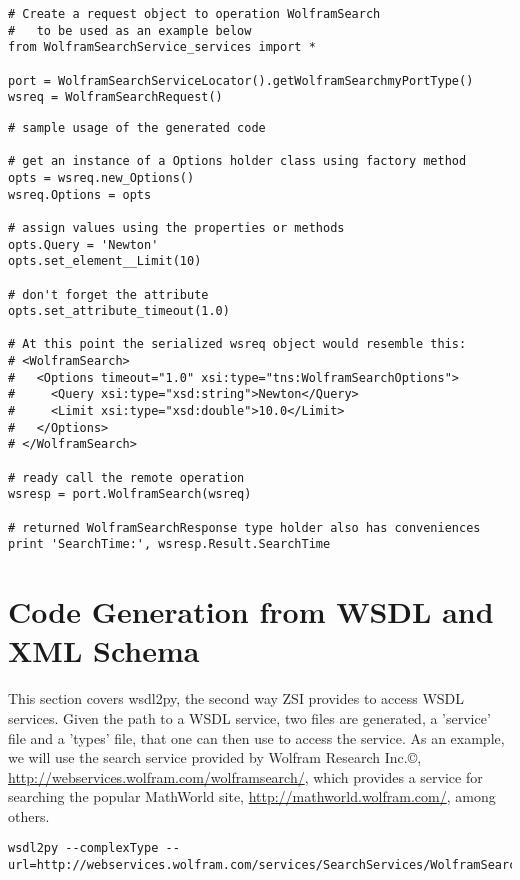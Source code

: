 \begin{verbatim}
# Create a request object to operation WolframSearch
#   to be used as an example below
from WolframSearchService_services import *

port = WolframSearchServiceLocator().getWolframSearchmyPortType()
wsreq = WolframSearchRequest()
\end{verbatim}



\begin{verbatim}
# sample usage of the generated code

# get an instance of a Options holder class using factory method
opts = wsreq.new_Options()
wsreq.Options = opts

# assign values using the properties or methods
opts.Query = 'Newton'
opts.set_element__Limit(10)

# don't forget the attribute
opts.set_attribute_timeout(1.0)

# At this point the serialized wsreq object would resemble this:
# <WolframSearch>
#   <Options timeout="1.0" xsi:type="tns:WolframSearchOptions">
#     <Query xsi:type="xsd:string">Newton</Query>
#     <Limit xsi:type="xsd:double">10.0</Limit>
#   </Options>
# </WolframSearch>

# ready call the remote operation
wsresp = port.WolframSearch(wsreq)

# returned WolframSearchResponse type holder also has conveniences
print 'SearchTime:', wsresp.Result.SearchTime
\end{verbatim}

\section{Code Generation from WSDL and XML Schema}

This section covers wsdl2py, the second way ZSI provides to access WSDL
services.  Given the path to a WSDL service, two files are generated, a 
'service' file and a 'types' file, that one can then use to access the
service.  As an example, we will use the search service provided by Wolfram
Research Inc.\copyright{}, \url{http://webservices.wolfram.com/wolframsearch/}, 
which provides a service for searching the popular MathWorld site, 
\url{http://mathworld.wolfram.com/}, among others.

\begin{verbatim}
wsdl2py --complexType --url=http://webservices.wolfram.com/services/SearchServices/WolframSearch2.wsdl
\end{verbatim}

